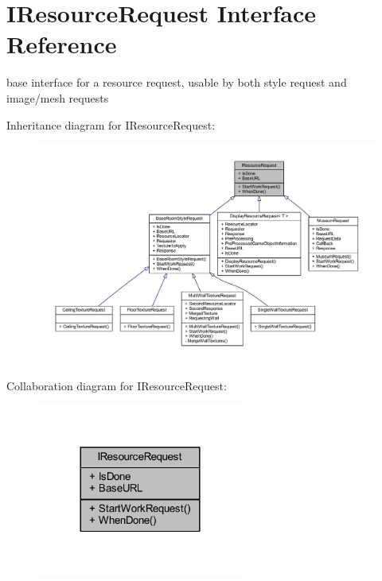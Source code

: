 \hypertarget{interface_i_resource_request}{}\section{I\+Resource\+Request Interface Reference}
\label{interface_i_resource_request}


base interface for a resource request, usable by both style request and image/mesh requests  




Inheritance diagram for I\+Resource\+Request\+:
\nopagebreak
\begin{figure}[H]
\begin{center}
\leavevmode
\includegraphics[width=350pt]{interface_i_resource_request__inherit__graph}
\end{center}
\end{figure}


Collaboration diagram for I\+Resource\+Request\+:
\nopagebreak
\begin{figure}[H]
\begin{center}
\leavevmode
\includegraphics[width=192pt]{interface_i_resource_request__coll__graph}
\end{center}
\end{figure}
